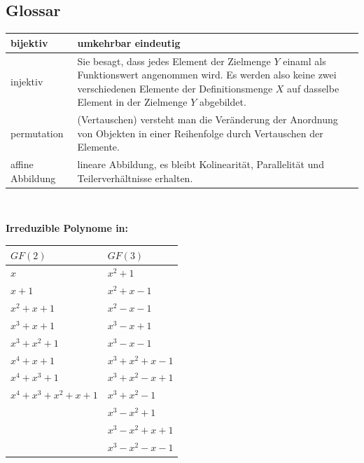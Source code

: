 \subsection{Glossar}
\begin{minipage}{12.5cm}
\begin{tabular}[]{|l |p{9cm}| }
	\hline
	bijektiv			&	umkehrbar eindeutig		\\
	\hline
	injektiv			&	Sie besagt, dass jedes Element der Zielmenge $Y$ einaml als Funktionswert angenommen wird.
							Es werden also keine zwei verschiedenen Elemente der Definitionsmenge $X$ auf dasselbe Element in 
							der Zielmenge $Y$ abgebildet.		\\
	\hline
	permutation			&	(Vertauschen) versteht man die Ver\"anderung der Anordnung von Objekten in einer Reihenfolge
							durch Vertauschen der Elemente.			\\
	\hline
	affine Abbildung	&	lineare Abbildung, es bleibt Kolinearit\"at, Parallelit\"at und Teilerverh\"altnisse erhalten.	 \\
	
	\hline
\end{tabular}\\

\end{minipage}
\begin{minipage}{6cm}
\textbf{Irreduzible Polynome in:}\\
\begin{tabular}{l l}
	$GF(2)$				&	$GF(3)$\\
	\hline
	$x$					&	$x^2+1$\\
	$x+1$				&	$x^2+x-1$\\
	$x^2+x+1$			&	$x^2-x-1$\\
	$x^3+x+1$			&	$x^3-x+1$\\
	$x^3+x^2+1$			&	$x^3-x-1$\\
	$x^4+x+1$			&	$x^3+x^2+x-1$\\
	$x^4+x^3+1$			&	$x^3+x^2-x+1$\\
	$x^4+x^3+x^2+x+1$	&	$x^3+x^2-1$\\ 
						&	$x^3-x^2+1$\\ 
						&	$x^3-x^2+x+1$\\ 
						&	$x^3-x^2-x-1$\\ 
\end{tabular}
\end{minipage} \\

